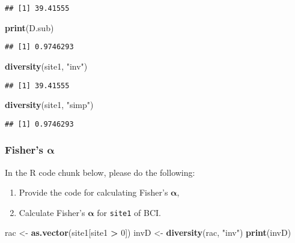 \documentclass[
]{article}
\newenvironment{Shaded}{\begin{snugshade}}{\end{snugshade}}
\newcommand{\DecValTok}[1]{\textcolor[rgb]{0.00,0.00,0.81}{#1}}
\newcommand{\FunctionTok}[1]{\textcolor[rgb]{0.13,0.29,0.53}{\textbf{#1}}}
\newcommand{\NormalTok}[1]{#1}
\newcommand{\OtherTok}[1]{\textcolor[rgb]{0.56,0.35,0.01}{#1}}
\newcommand{\SpecialCharTok}[1]{\textcolor[rgb]{0.81,0.36,0.00}{\textbf{#1}}}
\newcommand{\StringTok}[1]{\textcolor[rgb]{0.31,0.60,0.02}{#1}}
\begin{document}
\begin{verbatim}
## [1] 39.41555
\end{verbatim}

\begin{Shaded}
\begin{Highlighting}[]
\FunctionTok{print}\NormalTok{(D.sub)}
\end{Highlighting}
\end{Shaded}

\begin{verbatim}
## [1] 0.9746293
\end{verbatim}

\begin{Shaded}
\begin{Highlighting}[]
\FunctionTok{diversity}\NormalTok{(site1, }\StringTok{"inv"}\NormalTok{)}
\end{Highlighting}
\end{Shaded}

\begin{verbatim}
## [1] 39.41555
\end{verbatim}

\begin{Shaded}
\begin{Highlighting}[]
\FunctionTok{diversity}\NormalTok{(site1, }\StringTok{"simp"}\NormalTok{)}
\end{Highlighting}
\end{Shaded}

\begin{verbatim}
## [1] 0.9746293
\end{verbatim}

\subsubsection{\texorpdfstring{Fisher's
\(\boldsymbol\alpha\)}{Fisher's \textbackslash boldsymbol\textbackslash alpha}}\label{fishers-boldsymbolalpha}

In the R code chunk below, please do the following:

\begin{enumerate}
\def\labelenumi{\arabic{enumi}.}
\item
  Provide the code for calculating Fisher's \(\boldsymbol\alpha\),
\item
  Calculate Fisher's \(\boldsymbol\alpha\) for \texttt{site1} of BCI.
\end{enumerate}

\begin{Shaded}
\begin{Highlighting}[]
\NormalTok{rac }\OtherTok{\textless{}{-}} \FunctionTok{as.vector}\NormalTok{(site1[site1 }\SpecialCharTok{\textgreater{}} \DecValTok{0}\NormalTok{])}
\NormalTok{invD }\OtherTok{\textless{}{-}} \FunctionTok{diversity}\NormalTok{(rac, }\StringTok{"inv"}\NormalTok{)}
\FunctionTok{print}\NormalTok{(invD)}
\end{Highlighting}
\end{Shaded}
\end{document}
